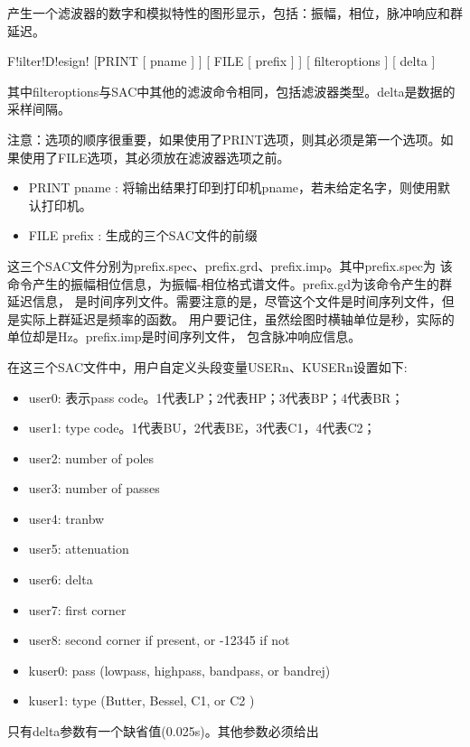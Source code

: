 \label{cmd:filterdesign}

产生一个滤波器的数字和模拟特性的图形显示，包括：振幅，相位，脉冲响应和群延迟。

\begin{SACSTX}
F!ilter!D!esign! [PRINT [ pname ] ] [ FILE [ prefix ] ] [ filteroptions ] [ delta ]
\end{SACSTX}
其中filteroptions与SAC中其他的滤波命令相同，包括滤波器类型。delta是数据的采样间隔。

注意：选项的顺序很重要，如果使用了PRINT选项，则其必须是第一个选项。如果使用了FILE选项，其必须放在滤波器选项之前。

\begin{itemize}
\item PRINT pname : 将输出结果打印到打印机pname，若未给定名字，则使用默认打印机。
\item FILE prefix : 生成的三个SAC文件的前缀
\end{itemize}

这三个SAC文件分别为prefix.spec、prefix.grd、prefix.imp。其中prefix.spec为
该命令产生的振幅相位信息，为振幅-相位格式谱文件。prefix.gd为该命令产生的群延迟信息，
是时间序列文件。需要注意的是，尽管这个文件是时间序列文件，但是实际上群延迟是频率的函数。
用户要记住，虽然绘图时横轴单位是秒，实际的单位却是Hz。prefix.imp是时间序列文件，
包含脉冲响应信息。

在这三个SAC文件中，用户自定义头段变量USERn、KUSERn设置如下:
\begin{itemize}
\item user0: 表示pass code。1代表LP；2代表HP；3代表BP；4代表BR；
\item user1: type code。1代表BU，2代表BE，3代表C1，4代表C2；
\item user2:  number of poles
\item user3:  number of passes
\item user4:  tranbw
\item user5:  attenuation
\item user6:  delta
\item user7:  first corner
\item user8:  second corner if present, or -12345 if not
\item kuser0: pass (lowpass, highpass, bandpass, or bandrej)
\item kuser1: type (Butter, Bessel, C1, or C2 )
\end{itemize}

只有delta参数有一个缺省值(0.025s)。其他参数必须给出


